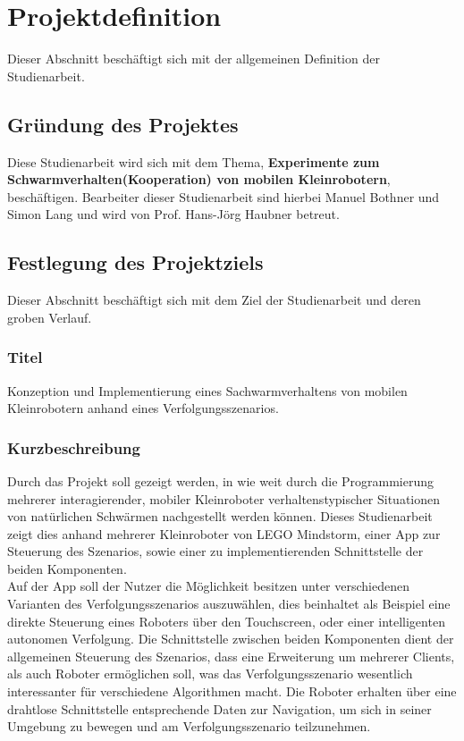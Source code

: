 \section{Projektdefinition}

Dieser Abschnitt beschäftigt sich mit der allgemeinen Definition der Studienarbeit.

\subsection{Gründung des Projektes}

Diese Studienarbeit wird sich mit dem Thema, \textbf{Experimente zum Schwarmverhalten(Kooperation) von mobilen Kleinrobotern}, beschäftigen. Bearbeiter dieser Studienarbeit sind hierbei Manuel Bothner und Simon Lang und wird von Prof. Hans-Jörg Haubner betreut.

\subsection{Festlegung des Projektziels}

Dieser Abschnitt beschäftigt sich mit dem Ziel der Studienarbeit und deren groben Verlauf.

\subsubsection{Titel}

Konzeption und Implementierung eines Sachwarmverhaltens von mobilen Kleinrobotern anhand eines Verfolgungsszenarios.\\

\subsubsection{Kurzbeschreibung}

Durch das Projekt soll gezeigt werden, in wie weit durch die Programmierung mehrerer interagierender, mobiler Kleinroboter verhaltenstypischer Situationen von natürlichen Schwärmen nachgestellt werden können. Dieses Studienarbeit zeigt dies anhand mehrerer Kleinroboter von LEGO Mindstorm, einer App zur Steuerung des Szenarios, sowie einer zu implementierenden Schnittstelle der beiden Komponenten.\\
Auf der App soll der Nutzer die Möglichkeit besitzen unter verschiedenen Varianten des Verfolgungsszenarios auszuwählen, dies beinhaltet als Beispiel eine direkte Steuerung eines Roboters über den Touchscreen, oder einer intelligenten autonomen Verfolgung. Die Schnittstelle zwischen beiden Komponenten dient der allgemeinen Steuerung des Szenarios, dass eine Erweiterung um mehrerer Clients, als auch Roboter ermöglichen soll, was das Verfolgungsszenario wesentlich interessanter für verschiedene Algorithmen macht. Die Roboter erhalten über eine drahtlose Schnittstelle entsprechende Daten zur Navigation, um sich in seiner Umgebung zu bewegen und am Verfolgungsszenario teilzunehmen.\\